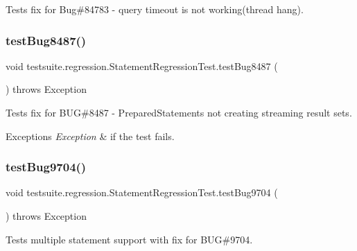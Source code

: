 Tests fix for Bug\#84783 -\/ query timeout is not working(thread hang). \mbox{\label{classtestsuite_1_1regression_1_1_statement_regression_test_af4aa8a9e2d17d0762f6a5f7fa2373595}} 
\subsubsection{\texorpdfstring{test\+Bug8487()}{testBug8487()}}
{\footnotesize\ttfamily void testsuite.\+regression.\+Statement\+Regression\+Test.\+test\+Bug8487 (\begin{DoxyParamCaption}{ }\end{DoxyParamCaption}) throws Exception}

Tests fix for B\+UG\#8487 -\/ Prepared\+Statements not creating streaming result sets.


\begin{DoxyExceptions}{Exceptions}
{\em Exception} & if the test fails. \\
\hline
\end{DoxyExceptions}
\mbox{\label{classtestsuite_1_1regression_1_1_statement_regression_test_a5da35a1c85dea6e6eac135094859b6d2}} 
\subsubsection{\texorpdfstring{test\+Bug9704()}{testBug9704()}}
{\footnotesize\ttfamily void testsuite.\+regression.\+Statement\+Regression\+Test.\+test\+Bug9704 (\begin{DoxyParamCaption}{ }\end{DoxyParamCaption}) throws Exception}

Tests multiple statement support with fix for B\+UG\#9704.


